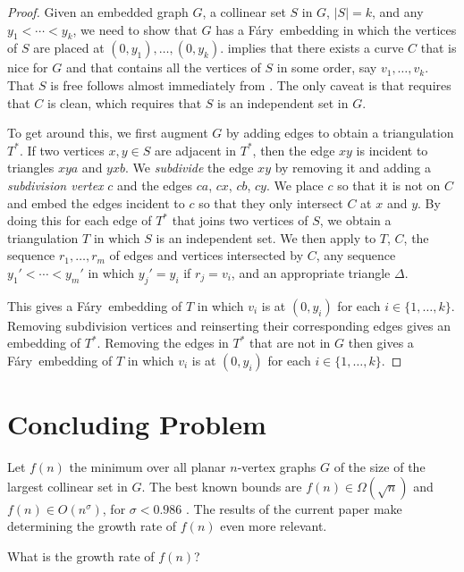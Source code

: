 \documentclass{patmorin}
\newcommand{\Fary}{Fáry}
\begin{document}
\begin{proof}
   Given an embedded graph $G$, a collinear set $S$ in $G$, $|S|=k$, and
   any $y_1<\cdots<y_k$, we need to show that $G$ has a \Fary\ embedding
   in which the vertices of $S$ are placed at $(0,y_1),\ldots,(0,y_k)$.
    implies that there exists a curve $C$ that is
   nice for $G$ and that contains all the vertices of $S$ in some order,
   say $v_1,\ldots,v_k$.  That $S$ is free follows almost immediately from
   .  The only caveat is that  requires that
   $C$ is clean, which requires that $S$ is an independent set in $G$.

   To get around this, we first augment $G$ by adding edges to obtain a
   triangulation $T^*$. If two vertices $x,y\in S$ are adjacent
   in $T^*$, then the edge $xy$ is incident to triangles $xya$ and
   $yxb$.  We \emph{subdivide} the edge $xy$ by removing it and adding
   a \emph{subdivision vertex} $c$ and the edges $ca$, $cx$, $cb$, $cy$.
   We place $c$ so that it is not on $C$ and embed the edges incident to
   $c$ so that they only intersect $C$ at $x$ and $y$.  By doing this
   for each edge of $T^*$ that joins two vertices of $S$, we obtain a
   triangulation $T$ in which $S$ is an independent set.  We then apply
    to $T$, $C$, the sequence $r_1,\ldots,r_m$ of edges
   and vertices intersected by $C$, any sequence $y_1'<\cdots<y_m'$
   in which $y_j'=y_i$ if $r_j=v_i$, and an appropriate triangle $\Delta$.

   This gives a \Fary\ embedding of $T$ in which $v_i$ is at $(0,y_i)$
   for each $i\in\{1,\ldots,k\}$.  Removing subdivision vertices and
   reinserting their corresponding edges gives an embedding of $T^*$.
   Removing the edges in $T^*$ that are not in $G$ then gives a
   \Fary\ embedding of $T$ in which $v_i$ is at $(0,y_i)$ for each
   $i\in\{1,\ldots,k\}$.
\end{proof}

\section{Concluding Problem}

Let $f(n)$ the minimum over all planar $n$-vertex graphs $G$ of the
size of the largest collinear set in $G$.  The best known bounds are
$f(n)\in\Omega(\sqrt{n})$ and $f(n)\in O(n^\sigma)$, for $\sigma
< 0.986$ \cite{bose.dujmovic.ea:polynomial,ravsky.verbitsky:on}.
The results of the current paper make determining the growth rate of
$f(n)$ even more relevant.

\begin{op}
   What is the growth rate of $f(n)$?
\end{op}




\end{document}
